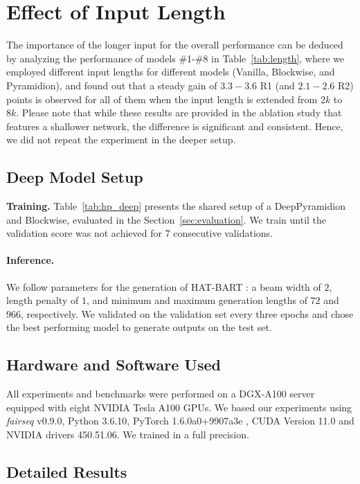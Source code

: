 \documentclass{article}
\begin{document}
\section{Effect of Input Length}
The importance of the longer input for the overall performance can be deduced by analyzing the performance of models \#1-\#8 in Table~\ref{tab:length}, where we employed different input lengths for different models (Vanilla, Blockwise, and Pyramidion), and found out that a steady gain of $3.3-3.6$ R1 (and $2.1-2.6$ R2) points is observed for all of them when the input length is extended from $2k$ to $8k$. Please note that while these results are provided in the ablation study that features a shallower network, the difference is significant and consistent. Hence, we did not repeat the experiment in the deeper setup.

\subsection{Deep Model Setup}\label{appendix_sub_deeper}
\textbf{Training.}
Table~\ref{tab:hp_deep} presents the shared setup of a DeepPyramidion and Blockwise, evaluated in the Section~\ref{sec:evaluation}. We train until the validation score was not achieved for $7$ consecutive validations.



\paragraph{Inference.}
We follow parameters for the generation of HAT-BART \cite{rohde2021hierarchical}: a beam width of $2$, length penalty of $1$, and minimum and maximum generation lengths of $72$ and $966$, respectively. We validated on the validation set every three epochs and chose the best performing model to generate outputs on the test set. 

\subsection{Hardware and Software Used}\label{appendix_sub_hyperparams}
All experiments and benchmarks were performed on a DGX-A100 server equipped with eight NVIDIA Tesla A100 GPUs. We based our experiments using \textit{fairseq} \citep{ott-etal-2019-fairseq} v0.9.0, Python 3.6.10, PyTorch 1.6.0a0+9907a3e \citep{NEURIPS2019_9015}, CUDA Version 11.0 and NVIDIA drivers 450.51.06. We trained in a full precision. 


\subsection{Detailed Results}
\end{document}
